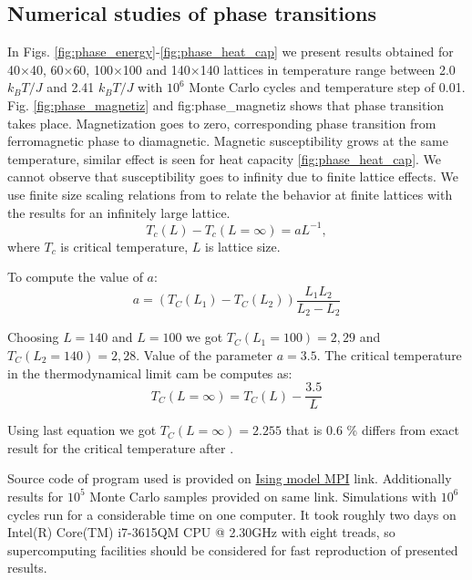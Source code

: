 \documentclass[10pt]{article}
\begin{document}
\newpage

\subsection{Numerical studies of phase transitions}
In Figs. \ref{fig:phase_energy}-\ref{fig:phase_heat_cap} we present results obtained for 40$\times$40, 60$\times$60, 100$\times$100 and 140$\times$140 lattices in temperature range between 2.0 $k_BT/J$ and 2.41 $k_BT/J$ with $10^6$ Monte Carlo cycles and temperature step of 0.01. Fig. \ref{fig:phase_magnetiz} and fig:phase_magnetiz shows that phase transition takes place. Magnetization goes to zero, corresponding phase transition from ferromagnetic phase to diamagnetic. Magnetic susceptibility grows at the same temperature, similar effect is seen for heat capacity \ref{fig:phase_heat_cap}. We cannot observe that susceptibility goes to infinity due to finite lattice effects.
We use finite size scaling relations from \cite{one} to relate the behavior at finite lattices with the results for
an infinitely large lattice.
\[
T_c(L) - T_c(L = \infty ) = a L^{-1},
\]
where $T_c$ is critical temperature, $L$ is lattice size. 

To compute the value of $a$:
\[
a=(T_C(L_1)-T_C(L_2))\frac{L_1 L_2}{L_2-L_2}
\]


Choosing $L=140$ and $L=100$ we got $T_C(L_1 =100)=2,29$ and $T_C(L_2 =140)=2,28$. Value of the parameter $a=3.5$.
The critical temperature in the thermodynamical limit cam be computes as:
\[
T_C(L=\infty) = T_C(L)-\frac{3.5}{L}
\]

Using last equation we got $T_C(L=\infty)= 2.255$ that is $0.6$ \% differs from exact result for the critical temperature after \cite{Onsager}.



Source code of program used is provided on \href{https://github.com/andrei-fys/fys4150/tree/master/Project_4/src/MPI}{Ising model MPI} link.
Additionally results for $10^5$ Monte Carlo samples provided on same link. Simulations with $10^6$ cycles run for a considerable time on one computer. It took roughly two days on Intel(R) Core(TM) i7-3615QM CPU @ 2.30GHz with eight treads, so supercomputing facilities should be considered for fast reproduction of presented results. 
\end{document}
